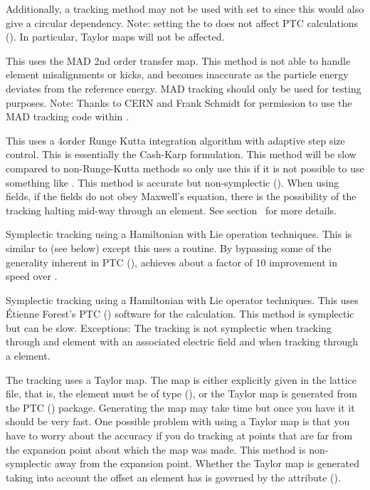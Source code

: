 \begin{description}
Additionally, a  tracking method may not be used with  set to
 since this would also give a circular dependency. Note: setting the
 to  does not affect PTC calculations (). In
particular, Taylor maps will not be affected.

\item[\vn{MAD}]
This uses the MAD 2nd order transfer map. This method is not able to handle element misalignments or
kicks, and becomes inaccurate as the particle energy deviates from the reference energy. MAD
tracking should only be used for testing purposes. Note: Thanks to CERN and Frank Schmidt for
permission to use the MAD tracking code within \bmad.

\item[\vn{runge_kutta}]
This uses a 4\Th order Runge Kutta integration algorithm with adaptive step size control.  This is
essentially the Cash-Karp formulation. This method will be slow compared to non-Runge-Kutta methods
so only use this if it is not possible to use something like .  This method is
accurate but non-symplectic ().  When using  fields, if the
fields do not obey Maxwell's equation, there is the possibility of the  tracking
halting mid-way through an element. See section~ for more details.

\item[\vn{Symp_Lie_Bmad}]
Symplectic tracking using a Hamiltonian with Lie operation techniques.  This is similar to
 (see below) except this uses a \bmad routine. By bypassing some of the generality
inherent in PTC (),  achieves about a factor of 10 improvement
in speed over .

\item[\vn{Symp_Lie_PTC}]
Symplectic tracking using a Hamiltonian with Lie operator techniques.  This uses \'Etienne Forest's
PTC () software for the calculation. This method is symplectic but can be
slow. Exceptions: The tracking is not symplectic when tracking through and element with an
associated electric field and when tracking through a  element.

\item[\vn{Taylor}]
The tracking uses a Taylor map. The map is either explicitly given in the lattice file, that is, the
element must be of type  (), or the Taylor map is generated from the PTC
() package. Generating the map may take time but once you have it it should be
very fast. One possible problem with using a Taylor map is that you have to worry about the accuracy
if you do tracking at points that are far from the expansion point about which the map was
made. This method is non-symplectic away from the expansion point. Whether the Taylor map is
generated taking into account the offset an element has is governed by the
 attribute ().


\end{description}
